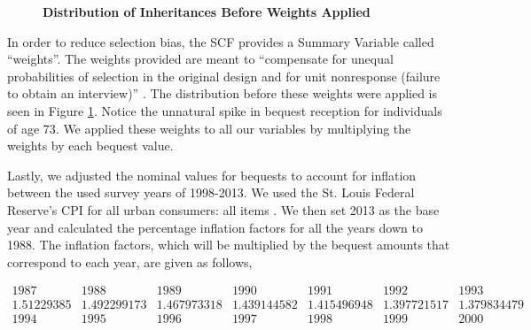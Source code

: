 \documentclass[letterpaper,12pt]{article}
\newcommand{\quotes}[1]{``#1''}
\theoremstyle{definition}
\begin{document}
\begin{spacing}{1.5}
  \begin{figure}[htbp]\centering \captionsetup{width=5.5in}
      \caption{\label{Weightfig}\textbf{Distribution of Inheritances Before Weights Applied}}
    \end{figure}
  \newpage

  In order to reduce selection bias, the SCF provides a Summary Variable called \quotes{weights}. The weights provided are meant to \quotes{compensate for unequal probabilities of selection in the original design and for unit nonresponse (failure to obtain an interview)} \citet{FEDweight}. The distribution before these weights were applied is seen in Figure \ref{Weightfig}. Notice the unnatural spike in bequest reception for individuals of age 73. We applied these weights to all our variables by multiplying the weights by each bequest value.

  Lastly, we adjusted the nominal values for bequests to account for inflation between the used survey years of 1998-2013. We used the St. Louis Federal Reserve's CPI for all urban consumers: all items \citet{StFed} . We then set 2013 as the base year and calculated the percentage inflation factors for all the years down to 1988. The inflation factors, which will be multiplied by the bequest amounts that correspond to each year, are given as follows,

  \[
  \begin{matrix}
  \hline
  1987&  1988&  1989&  1990&  1991&  1992&  1993\\

  1.51229385 & 1.492299173& 1.467973318 & 1.439144582 & 1.415496948 & 1.397721517 & 1.379834479 \\
  \hline

   1994&  1995&  1996& 1997&  1998&  1999&  2000\\


\end{matrix}\]
\end{spacing}
\end{document}
